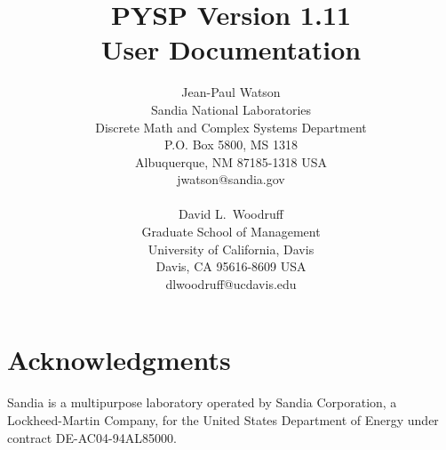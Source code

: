 \documentclass[11pt]{article}
\begin{document}
\title{PYSP Version 1.11\\
User Documentation}

\author{Jean-Paul Watson \\
        Sandia National Laboratories \\
        Discrete Math and Complex Systems Department \\
        P.O. Box 5800, MS 1318 \\
        Albuquerque, NM 87185-1318 USA \\
        jwatson@sandia.gov \\
        \\
        David L.\ Woodruff \\
        Graduate School of Management \\
        University of California, Davis \\
        Davis, CA 95616-8609 USA \\
        dlwoodruff@ucdavis.edu \\
}


\maketitle



{}



\section*{Acknowledgments}

Sandia is a multipurpose laboratory operated by Sandia Corporation, a 
Lockheed-Martin Company, for the United States Department of Energy 
under contract DE-AC04-94AL85000. 
\end{document}
